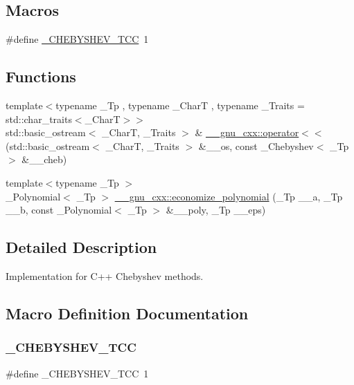 \subsection*{Macros}
\begin{DoxyCompactItemize}
\item 
\#define \hyperlink{chebyshev_8tcc_a2939e7430b81afbbf33383ef6e6993a6}{\+\_\+\+C\+H\+E\+B\+Y\+S\+H\+E\+V\+\_\+\+T\+CC}~1
\end{DoxyCompactItemize}
\subsection*{Functions}
\begin{DoxyCompactItemize}
\item 
{\footnotesize template$<$typename \+\_\+\+Tp , typename \+\_\+\+CharT , typename \+\_\+\+Traits  = std\+::char\+\_\+traits$<$\+\_\+\+Char\+T$>$$>$ }\\std\+::basic\+\_\+ostream$<$ \+\_\+\+CharT, \+\_\+\+Traits $>$ \& \hyperlink{namespace____gnu__cxx_ae90394e47a70b69b61486e43a7c13116}{\+\_\+\+\_\+gnu\+\_\+cxx\+::operator$<$$<$} (std\+::basic\+\_\+ostream$<$ \+\_\+\+CharT, \+\_\+\+Traits $>$ \&\+\_\+\+\_\+os, const \+\_\+\+Chebyshev$<$ \+\_\+\+Tp $>$ \&\+\_\+\+\_\+cheb)
\item 
{\footnotesize template$<$typename \+\_\+\+Tp $>$ }\\\+\_\+\+Polynomial$<$ \+\_\+\+Tp $>$ \hyperlink{namespace____gnu__cxx_a917fd750f0e3fb9fd440bf3ecf72c97b}{\+\_\+\+\_\+gnu\+\_\+cxx\+::economize\+\_\+polynomial} (\+\_\+\+Tp \+\_\+\+\_\+a, \+\_\+\+Tp \+\_\+\+\_\+b, const \+\_\+\+Polynomial$<$ \+\_\+\+Tp $>$ \&\+\_\+\+\_\+poly, \+\_\+\+Tp \+\_\+\+\_\+eps)
\end{DoxyCompactItemize}


\subsection{Detailed Description}
Implementation for C++ Chebyshev methods. 

\subsection{Macro Definition Documentation}
\mbox{\label{chebyshev_8tcc_a2939e7430b81afbbf33383ef6e6993a6}} 
\subsubsection{\texorpdfstring{\+\_\+\+C\+H\+E\+B\+Y\+S\+H\+E\+V\+\_\+\+T\+CC}{\_CHEBYSHEV\_TCC}}
{\footnotesize\ttfamily \#define \+\_\+\+C\+H\+E\+B\+Y\+S\+H\+E\+V\+\_\+\+T\+CC~1}

